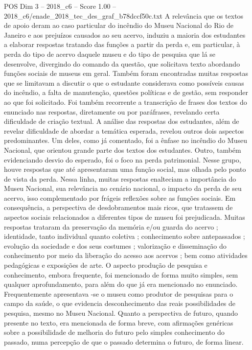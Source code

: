 \begin{textsample}{POS Dim 3 – 2018\_c6 – Score 1.00 – 2018\_c6/enade\_2018\_tec\_des\_graf\_b78dccf50c.txt}
A relevância que os textos de apoio deram ao caso particular do incêndio do Museu Nacional do Rio de Janeiro e aos prejuízos causados ao seu acervo, induziu a maioria dos estudantes a elaborar respostas tratando das funções a partir da perda e, em particular, à perda do tipo de acervo daquele museu e do tipo de pesquisa que lá se desenvolve, divergindo do comando da questão, que solicitava texto abordando funções sociais de museus em geral.
Também foram encontradas muitas respostas que se limitavam a discutir o que o estudante considerava como possíveis causas do incêndio, a falta de manutenção, questões políticas e de gestão, sem responder ao que foi solicitado.
Foi também recorrente a transcrição de frases dos textos do enunciado nas respostas, diretamente ou por paráfrases, revelando certa dificuldade de criação textual.
A análise das respostas dos estudantes, além de revelar dificuldade de abordar a temática esperada, revelou outros dois aspectos predominantes.
Um deles, como já comentado, foi a ênfase no incêndio do Museu Nacional, que orientou grande parte dos textos dos estudantes.
Outro, também evidenciando desvio do esperado, foi o foco na perda patrimonial.
Nesse grupo, houve respostas que até apresentaram uma função social, mas olhada pelo ponto de vista da perda.
Nessa linha, muitas respostas enalteciam a importância do Museu Nacional, sua relevância no cenário nacional, o impacto da perda de seu acervo, isso complementado por frágeis reflexões sobre as funções sociais.
Em consequência, a perspectiva de desdobramentos mais ricos, que tratassem de aspectos sociais relacionados a diferentes tipos de museu foi prejudicada.
Muitas respostas trataram da preservação da memória e/ou guarda do acervo ; identidade, tanto individual quanto coletiva ; conhecimento sobre antepassados ; evolução da sociedade e dos seus costumes ; valorização e disseminação do conhecimento por meio da liberação do acesso aos acervos ; bem como atividades pedagógicas e exposições de arte.
O aspecto produção de pesquisa e conhecimento, embora frequente, foi mencionado de forma muito simples, sem qualquer aprofundamento, para além do que já era mencionado no enunciado.
Frequentemente apresentava -se o museu como produtor de pesquisas para o campo da saúde, o que evidencia desconhecimento das reais possibilidades de pesquisa, mesmo no Museu Nacional.
Quanto a perspectiva de futuro, quando presente no texto, era mencionada de forma breve, com afirmações genéricas sobre a possibilidade de melhoria do futuro pelo simples conhecimento do passado, numa percepção de que o passado determina o futuro, de forma linear.

\end{textsample}
